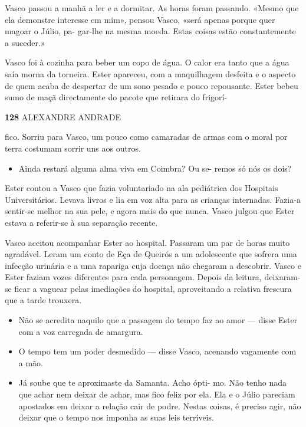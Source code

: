 Vasco passou a manhã a ler e a dormitar. As horas foram passando. «Mesmo
que ela demonstre interesse em mim», pensou Vasco, «será apenas porque
quer magoar o Júlio, pa- gar-lhe na mesma moeda. Estas coisas estão
constantemente a suceder.»

Vasco foi à cozinha para beber um copo de água. O calor era tanto que a
água saía morna da torneira. Ester apareceu, com a maquilhagem desfeita
e o aspecto de quem acaba de despertar de um sono pesado e pouco
repousante. Ester bebeu sumo de maçã directamente do pacote que retirara
do frigorí-

\textbf{128 }ALEXANDRE ANDRADE

fico. Sorriu para Vasco, um pouco como camaradas de armas com o moral
por terra costumam sorrir uns aos outros.

\begin{itemize}
\tightlist
\item
  Ainda restará alguma alma viva em Coimbra? Ou se- remos só nós os
  dois?
\end{itemize}

Ester contou a Vasco que fazia voluntariado na ala pediátrica dos
Hospitais Universitários. Levava livros e lia em voz alta para as
crianças internadas. Fazia-a sentir-se melhor na sua pele, e agora mais
do que nunca. Vasco julgou que Ester estava a referir-se à sua separação
recente.

Vasco aceitou acompanhar Ester ao hospital. Passaram um par de horas
muito agradável. Leram um conto de Eça de Queirós a um adolescente que
sofrera uma infecção urinária e a uma rapariga cuja doença não chegaram
a descobrir. Vasco e Ester faziam vozes diferentes para cada personagem.
Depois da leitura, deixaram-se ficar a vaguear pelas imediações do
hospital, aproveitando a relativa frescura que a tarde trouxera.

\begin{itemize}
\tightlist
\item
  Não se acredita naquilo que a passagem do tempo faz ao amor --- disse
  Ester com a voz carregada de amargura.
\item
  O tempo tem um poder desmedido --- disse Vasco, acenando vagamente com
  a mão.
\item
  Já soube que te aproximaste da Samanta. Acho ópti- mo. Não tenho nada
  que achar nem deixar de achar, mas fico feliz por ela. Ela e o Júlio
  pareciam apostados em deixar a relação cair de podre. Nestas coisas, é
  preciso agir, não deixar que o tempo nos imponha as suas leis
  terríveis.
\end{itemize}

